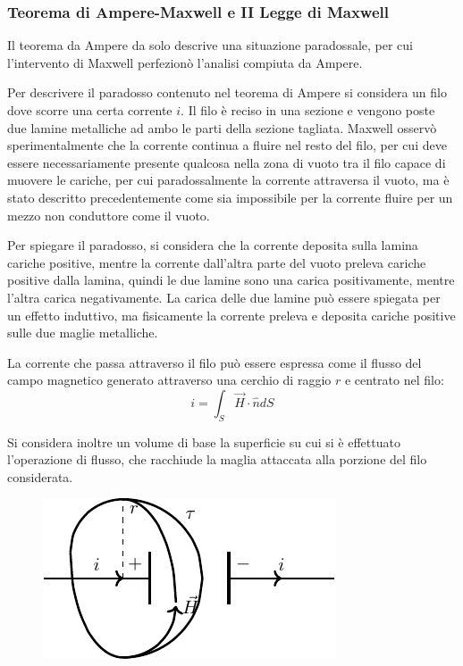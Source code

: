 \documentclass{article}
\numberwithin{equation}{subsection}
\begin{document}
\subsubsection{Teorema di Ampere-Maxwell e II Legge di Maxwell}
Il teorema da Ampere da solo descrive una situazione paradossale, per cui l'intervento di Maxwell perfezionò l'analisi compiuta da Ampere. 

Per descrivere il paradosso contenuto nel teorema di Ampere si considera un filo dove scorre una certa corrente $i$. Il filo è reciso in una sezione e vengono poste due 
lamine metalliche ad ambo le parti della sezione tagliata. Maxwell osservò sperimentalmente che la corrente continua a fluire nel resto del filo, per cui deve essere 
necessariamente presente qualcosa nella zona di vuoto tra il filo capace di muovere le cariche, per cui paradossalmente la corrente attraversa il vuoto, ma è stato descritto 
precedentemente come sia impossibile per la corrente fluire per un mezzo non conduttore come il vuoto. 

Per spiegare il paradosso, si considera che la corrente deposita sulla lamina cariche positive, mentre la corrente dall'altra parte del vuoto preleva cariche positive dalla lamina, 
quindi le due lamine sono una carica positivamente, mentre l'altra carica negativamente. La carica delle due lamine può essere spiegata per un effetto induttivo, ma fisicamente 
la corrente preleva e deposita cariche positive sulle due maglie metalliche. 


La corrente che passa attraverso il filo può essere espressa come il flusso del campo magnetico generato attraverso una cerchio di raggio $r$ e centrato nel filo:
\begin{equation*}
    i=\int_S{\vec{H}}\cdot\hat{n}dS
\end{equation*} 

Si considera inoltre un volume di base la superficie su cui si è effettuato l'operazione di flusso, che racchiude la maglia attaccata alla porzione del filo considerata. 

\begin{figure}[H]%
    \centering
    \includegraphics{flusso-filo-reciso.pdf}
    \label{fig:flusso-filo-reciso}
\end{figure}
\end{document}
